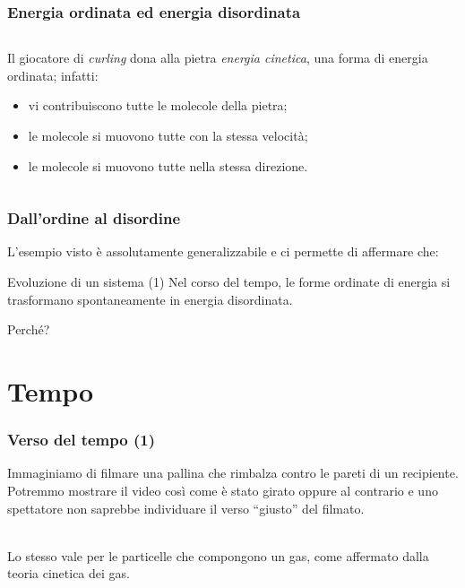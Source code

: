 \documentclass[]{beamer}
\theoremstyle{plain}
\begin{document}
\begin{frame}
  \frametitle{Energia ordinata ed energia disordinata}
\begin{columns}
\begin{column}{0.5\textwidth}
{\footnotesize Il giocatore di \emph{curling} dona alla pietra \emph{energia cinetica}, una forma di \alert{energia ordinata}; infatti:
\begin{itemize}
  \item vi contribuiscono tutte le molecole della pietra;
  \item le molecole si muovono tutte con la stessa velocità;
  \item le molecole si muovono tutte nella stessa direzione.
\end{itemize}}
\end{column}
\begin{column}{0.5\textwidth}
\end{column}
\end{columns}
\end{frame}


\begin{frame}
  \frametitle{Dall'ordine al disordine}
L'esempio visto è assolutamente generalizzabile e ci permette di affermare che:
\begin{block}{Evoluzione di un sistema (1)}
  Nel corso del tempo, le forme ordinate di energia si trasformano spontaneamente in energia disordinata.
\end{block}
Perché?
\end{frame}

\section{Tempo}

\begin{frame}
  \frametitle{Verso del tempo (1)}
Immaginiamo di filmare una pallina che rimbalza contro le pareti di un recipiente. Potremmo mostrare il video così come è stato girato oppure al contrario e uno spettatore non saprebbe individuare il verso ``giusto'' del filmato.\\~\\{\pause}


Lo stesso vale per le particelle che compongono un gas, come affermato dalla teoria cinetica dei gas.
\end{frame}
\end{document}
